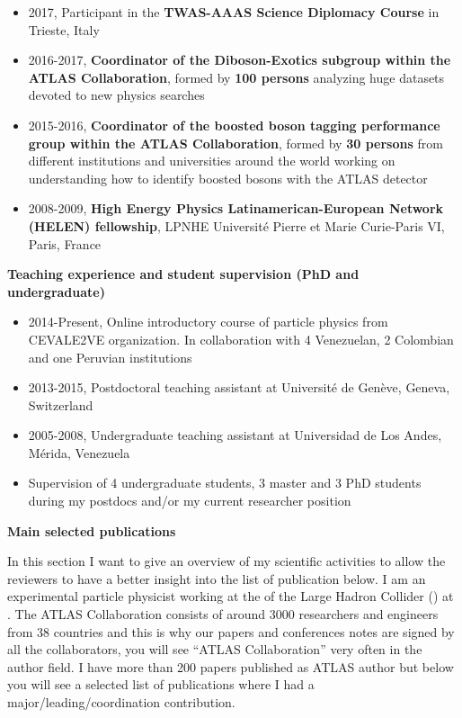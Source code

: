 \documentclass[letterpaper,10pt]{article}
\newcommand{\resheading}[1]{{\large \colorbox{mygrey}{\begin{minipage}{\textwidth}{\textbf{#1 \vphantom{p\^{E}}}}\end{minipage}}}}
\begin{document}
\begin{itemize}
		\item 2017, Participant in the \textbf{TWAS-AAAS Science Diplomacy Course} in Trieste, Italy
		\item 2016-2017, \textbf{Coordinator of the Diboson-Exotics subgroup within the ATLAS Collaboration}, formed by \textbf{100 persons} analyzing huge datasets devoted to new physics searches
		\item 2015-2016, \textbf{Coordinator of the boosted boson tagging performance group within the ATLAS Collaboration}, formed by \textbf{30 persons} from different institutions and universities around the world working on understanding how to identify boosted bosons with the ATLAS detector
		\item 2008-2009, \textbf{High Energy Physics Latinamerican-European Network (HELEN) fellowship}, LPNHE Université Pierre et Marie Curie-Paris VI, Paris, France
		
	\end{itemize} 

\noindent
\resheading{Teaching experience and student supervision (PhD and undergraduate)}
	\begin{itemize}
		\item 2014-Present, Online introductory course of particle physics from CEVALE2VE organization. In collaboration with 4 Venezuelan, 2 Colombian and one Peruvian institutions
		\item 2013-2015, Postdoctoral teaching assistant at Universit{\'e} de Gen{\`e}ve, Geneva, Switzerland
		\item 2005-2008, Undergraduate teaching assistant at Universidad de Los Andes, M{\'e}rida, Venezuela
		\item Supervision of 4 undergraduate students, 3 master and 3 PhD students during my postdocs and/or my current researcher position
	\end{itemize} 

\noindent
\resheading{Main selected publications}

In this section I want to give an overview of my scientific activities to allow the reviewers to have a better insight into the list of publication below. I am an experimental particle physicist working at the \href{http://atlas.ch/}{\color{blue}{ATLAS experiment}} of the Large Hadron Collider (\href{http://home.cern/topics/large-hadron-collider}{\color{blue}{LHC}}) at \href{http://home.cern/}{\color{blue}{CERN}}. The ATLAS Collaboration consists of around 3000 researchers and engineers from 38 countries and this is why our papers and conferences notes are signed by all the collaborators, you will see ``ATLAS Collaboration'' very often in the author field. I have more than 200 papers published as ATLAS author but below you will see a selected list of publications where I had a major/leading/coordination contribution. 
\end{document}

